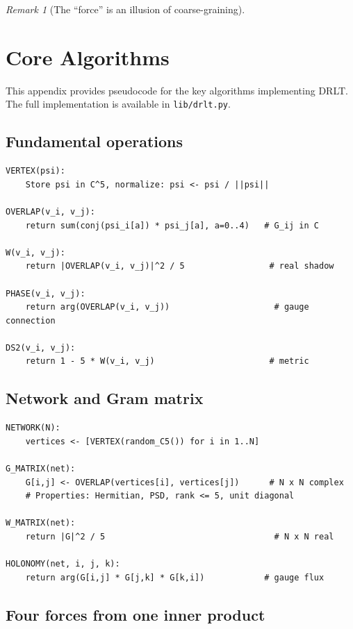 \documentclass[12pt]{article}
\theoremstyle{remark}
\newtheorem{remark}[theorem]{Remark}
\theoremstyle{definition}
\begin{document}
\begin{remark}[The ``force'' is an illusion of coarse-graining]

\section{Core Algorithms}
\label{app:code}

This appendix provides pseudocode for the key algorithms implementing DRLT. The full implementation is available in \texttt{lib/drlt.py}.

\subsection{Fundamental operations}

\begin{verbatim}
VERTEX(psi):
    Store psi in C^5, normalize: psi <- psi / ||psi||

OVERLAP(v_i, v_j):
    return sum(conj(psi_i[a]) * psi_j[a], a=0..4)   # G_ij in C

W(v_i, v_j):
    return |OVERLAP(v_i, v_j)|^2 / 5                 # real shadow

PHASE(v_i, v_j):
    return arg(OVERLAP(v_i, v_j))                     # gauge connection

DS2(v_i, v_j):
    return 1 - 5 * W(v_i, v_j)                       # metric
\end{verbatim}

\subsection{Network and Gram matrix}

\begin{verbatim}
NETWORK(N):
    vertices <- [VERTEX(random_C5()) for i in 1..N]

G_MATRIX(net):
    G[i,j] <- OVERLAP(vertices[i], vertices[j])      # N x N complex
    # Properties: Hermitian, PSD, rank <= 5, unit diagonal

W_MATRIX(net):
    return |G|^2 / 5                                  # N x N real

HOLONOMY(net, i, j, k):
    return arg(G[i,j] * G[j,k] * G[k,i])            # gauge flux
\end{verbatim}

\subsection{Four forces from one inner product}


\end{remark}
\end{document}
